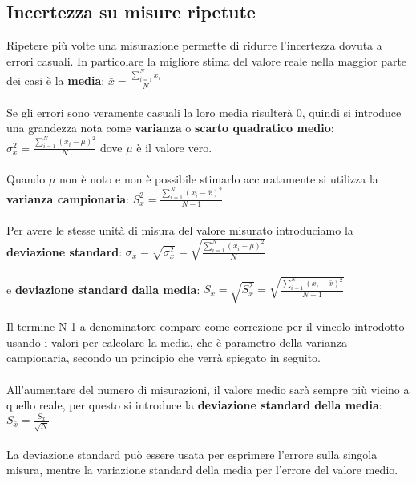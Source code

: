 \documentclass{article}
\begin{document}
\subsection{Incertezza su misure ripetute}
Ripetere più volte una misurazione permette di ridurre l'incertezza dovuta a errori casuali. In particolare la migliore stima del valore reale nella maggior parte dei casi è la \textbf{media}:
$\bar{x} = \frac{\sum_{i=1} ^N x_i}{N}$\\\\
Se gli errori sono veramente casuali la loro media risulterà 0, quindi si introduce una grandezza nota come \textbf{varianza} o \textbf{scarto quadratico medio}: $\sigma_x ^2 = \frac{\sum^N _{i=1} (x_i - \mu)^2}{N}$
dove $\mu$ è il valore vero.\\ \\
Quando $\mu$ non è noto e non è possibile stimarlo accuratamente si utilizza la \textbf{varianza campionaria}: $S^2 _x = \frac{\sum^N _{i=1} (x_i - \bar{x})^2}{N - 1}$\\ \\
Per avere le stesse unità di misura del valore misurato introduciamo la \textbf{deviazione standard}:
$\sigma_x = \sqrt{\sigma^2 _x} = \sqrt{\frac{\sum^N _{i=1} (x_i - \mu)^2}{N}}$ \\\\ e \textbf{deviazione standard dalla media}: $S_x = \sqrt{S^2 _x} = \sqrt{\frac{\sum^N _{i=1} (x_i - \bar{x})^2}{N - 1}}$ \\\\
Il termine N-1 a denominatore compare come correzione per il vincolo introdotto usando i valori per calcolare la media, che è parametro della varianza campionaria, secondo un principio che verrà spiegato in seguito.\\\\
All'aumentare del numero di misurazioni, il valore medio sarà sempre più vicino a quello reale, per questo si introduce la \textbf{deviazione standard della media}:
$S_{\bar{x}}= \frac{S_x}{\sqrt{N}}$\\\\
La deviazione standard può essere usata per esprimere l'errore sulla singola misura, mentre la variazione standard della media per l'errore del valore medio.
\end{document}
